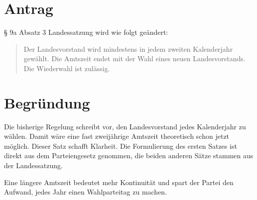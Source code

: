 \section{Antrag}

§ 9a Absatz 3 Landessatzung wird wie folgt geändert:

\begin{quote}
Der Landesvorstand wird mindestens in jedem zweiten Kalenderjahr gewählt. Die Amtszeit endet mit der Wahl eines neuen Landesvorstands. Die Wiederwahl ist zulässig.

\end{quote}
\section{Begründung}

Die bisherige Regelung schreibt vor, den Landesvorstand jedes Kalenderjahr zu wählen. Damit wäre eine fast zweijährige Amtszeit theoretisch schon jetzt möglich. Dieser Satz schafft Klarheit. Die Formulierung des ersten Satzes ist direkt aus dem Parteiengesetz genommen, die beiden anderen Sätze stammen aus der Landessatzung.

Eine längere Amtszeit bedeutet mehr Kontinuität und spart der Partei den Aufwand, jedes Jahr einen Wahlparteitag zu machen.
